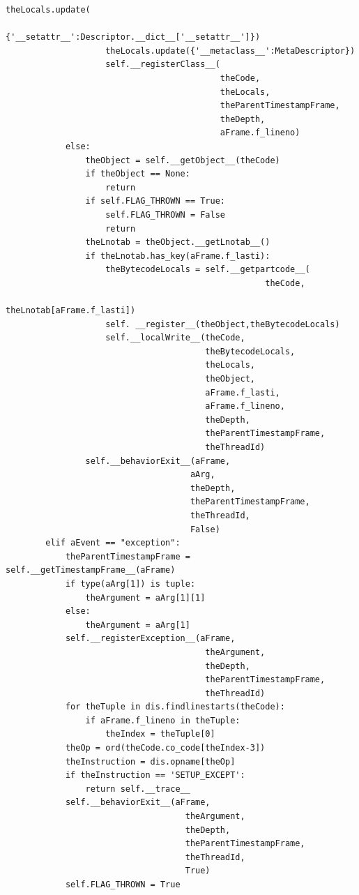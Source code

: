 \documentclass[12pt,legalpaper]{report}
\begin{document}
\begin{singlespace}
\begin{lstlisting}[style=Python]
                    theLocals.update(
                            {'__setattr__':Descriptor.__dict__['__setattr__']})
                    theLocals.update({'__metaclass__':MetaDescriptor})
                    self.__registerClass__(
                                           theCode,
                                           theLocals,
                                           theParentTimestampFrame,
                                           theDepth,
                                           aFrame.f_lineno)
            else:
                theObject = self.__getObject__(theCode)
                if theObject == None:
                    return
                if self.FLAG_THROWN == True:
                    self.FLAG_THROWN = False
                    return
                theLnotab = theObject.__getLnotab__()
                if theLnotab.has_key(aFrame.f_lasti):
                    theBytecodeLocals = self.__getpartcode__(
                                                    theCode,
                                                    theLnotab[aFrame.f_lasti])
                    self. __register__(theObject,theBytecodeLocals)
                    self.__localWrite__(theCode,
                                        theBytecodeLocals,
                                        theLocals,
                                        theObject,
                                        aFrame.f_lasti,
                                        aFrame.f_lineno,
                                        theDepth,
                                        theParentTimestampFrame,
                                        theThreadId)
                self.__behaviorExit__(aFrame,
                                     aArg,
                                     theDepth,
                                     theParentTimestampFrame,
                                     theThreadId,
                                     False)
        elif aEvent == "exception":
            theParentTimestampFrame = self.__getTimestampFrame__(aFrame)
            if type(aArg[1]) is tuple:
                theArgument = aArg[1][1]
            else:
                theArgument = aArg[1]
            self.__registerException__(aFrame,
                                        theArgument,
                                        theDepth,
                                        theParentTimestampFrame,
                                        theThreadId)
            for theTuple in dis.findlinestarts(theCode):
                if aFrame.f_lineno in theTuple:
                    theIndex = theTuple[0]
            theOp = ord(theCode.co_code[theIndex-3])
            theInstruction = dis.opname[theOp]
            if theInstruction == 'SETUP_EXCEPT':
                return self.__trace__
            self.__behaviorExit__(aFrame,
                                    theArgument,
                                    theDepth,
                                    theParentTimestampFrame,
                                    theThreadId,
                                    True)
            self.FLAG_THROWN = True           


\end{lstlisting}
\end{singlespace}
\end{document}
